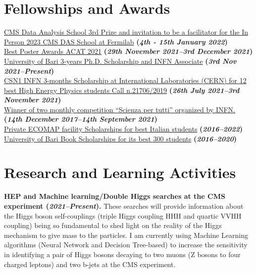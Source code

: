 \documentclass[11pt]{res}
\newcommand{\MarginText}[1]{\section{#1}\vspace{10pt}}
\begin{document}
\begin{resume}
\MarginText{Fellowships and Awards}
\href{https://indico.cern.ch/event/1088671/}{CMS Data Analysis School 3rd Prize and invitation to be a facilitator for the In Person 2023 CMS DAS School at Fermilab} \textbf{(\textit{4th - 15th January 2022})}\\
\href{https://indico.cern.ch/event/855454/contributions/4596351/}{Best Poster Awards ACAT 2021} \textbf{(\textit{29th November 2021--3rd December 2021})}\\
\href{https://dottorato.fisica.uniba.it}{University of Bari 3-years Ph.D. Scholarship and INFN Associate} \textbf{(\textit{3rd Nov 2021--Present})}\\
\href{https://drive.google.com/file/d/1-3EpNjAJlxgwI7W7nlvAxtIPrqbM1Xud/view?usp=sharing}{CSN1 INFN 3-months Scholarship at International Laboratories (CERN) for 12 best High Energy Physics students Call n.21706/2019} \textbf{(\textit{26th July 2021--3rd November 2021})}\\
\href{https://scienzapertutti.infn.it/spazio-scuola/concorso-mensile-sxt}{Winner of two monthly competition “Scienza per tutti” organized by INFN.} \textbf{(\textit{14th December 2017--14th September 2021})}\\
\href{https://www.ecomap.it/news.asp?idNews=67}{Private ECOMAP facility Scholarships for best Italian students} \textbf{(\textit{2016--2022})}\\
\href{https://www.uniba.it/studenti/segreterie-studenti/amministrative/buoni-libro-per-studenti-meritevoli}{University of Bari Book Scholarships for its best 300 students} \textbf{(\textit{2016--2020})}\\

\MarginText{Research and Learning Activities}

\textbf{HEP and Machine learning/Double Higgs searches at the CMS experiment \textbf{(\textit{2021--Present})}.} These searches will provide information about the Higgs boson self-couplings (triple Higgs coupling HHH and quartic VVHH coupling) being so fundamental to shed light on the reality of the Higgs mechanism to give mass to the particles. I am currently using Machine Learning algorithms (Neural Network and Decision Tree-based) to increase the sensitivity in identifying a pair of Higgs bosons decaying to two muons (Z bosons to four charged leptons) and two b-jets at the CMS experiment.


\end{resume}
\end{document}
